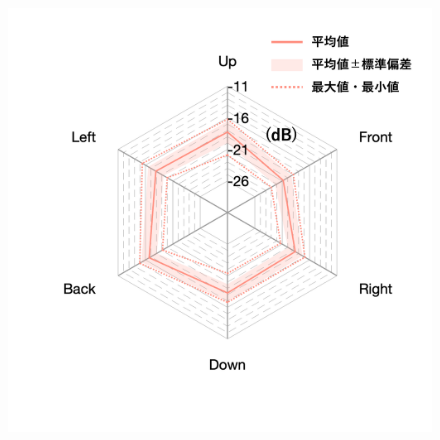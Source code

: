 \documentclass[11pt,a4j]{jreport}
\begin{document}
\begin{figure}[H]
\begin{minipage}[b]{.33\textwidth}
        \label{fig:S02early}
      \end{minipage}%
      \begin{minipage}[b]{.33\textwidth}
        \centering
        \includegraphics[width=1\linewidth]{images/realHallDirSt/early_S01_withLegend.png}
        \label{fig:S01early}
      \end{minipage}


\end{figure}
\end{document}
